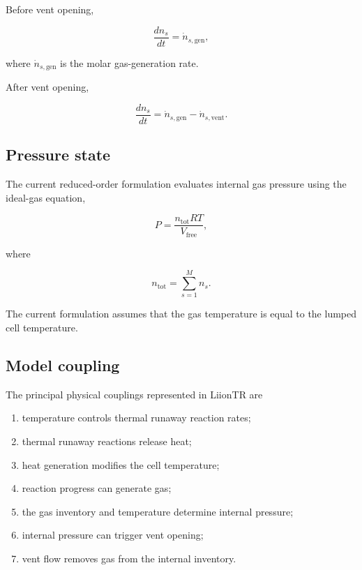 Before vent opening,

\begin{equation}
    \frac{dn_s}{dt}
    =
    \dot{n}_{s,\mathrm{gen}},
\end{equation}

where $\dot{n}_{s,\mathrm{gen}}$ is the molar gas-generation rate.

After vent opening,

\begin{equation}
    \frac{dn_s}{dt}
    =
    \dot{n}_{s,\mathrm{gen}}
    -
    \dot{n}_{s,\mathrm{vent}}.
    \label{eq:vented_species_balance}
\end{equation}


\subsection{Pressure state}

The current reduced-order formulation evaluates internal gas pressure
using the ideal-gas equation,

\begin{equation}
    P
    =
    \frac{
        n_{\mathrm{tot}} R T
    }{
        V_{\mathrm{free}}
    },
    \label{eq:ideal_pressure_framework}
\end{equation}

where

\begin{equation}
    n_{\mathrm{tot}}
    =
    \sum_{s=1}^{M}
    n_s.
\end{equation}

The current formulation assumes that the gas temperature is equal to the
lumped cell temperature.


\subsection{Model coupling}

The principal physical couplings represented in LiionTR are

\begin{enumerate}
    \item temperature controls thermal runaway reaction rates;
    \item thermal runaway reactions release heat;
    \item heat generation modifies the cell temperature;
    \item reaction progress can generate gas;
    \item the gas inventory and temperature determine internal pressure;
    \item internal pressure can trigger vent opening;
    \item vent flow removes gas from the internal inventory.
\end{enumerate}

